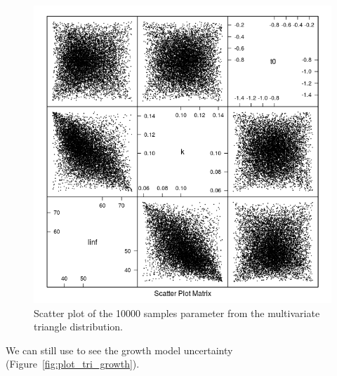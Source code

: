 \documentclass[a4paper,english,10pt]{article}\usepackage[]{graphicx}\usepackage[]{color}
\newenvironment{knitrout}{}{} %
\begin{document}
\begin{knitrout}
\color{fgcolor}\begin{figure}[H]

{\centering \includegraphics[width=.9\linewidth]{figure/plot_tri_scatter-1} 

}

\caption[Scatter plot of the 10000 samples parameter from the multivariate triangle distribution]{Scatter plot of the 10000 samples parameter from the multivariate triangle distribution.}\label{fig:plot_tri_scatter}
\end{figure}


\end{knitrout}

We can still use  to see the growth model uncertainty (Figure~\ref{fig:plot_tri_growth}).
\end{document}
